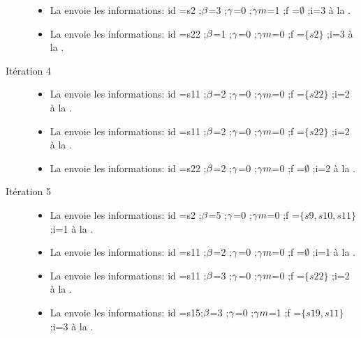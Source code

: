 \begin{Exemple}
\begin{description}
\begin{itemize}
			\item  La \mtree{} envoie les informations: id =s2 ;$\beta{}$=3 ;$\gamma{}$=0 ;$\gamma m{}$=1 ;f =$\emptyset$ ;i=3 à la \mone{}.
			\item  La \mtree{} envoie les informations: id =s22 ;$\beta{}$=1 ;$\gamma{}$=0 ;$\gamma m{}$=0 ;f =$\{s2\}$ ;i=3 à la \mtwo{}.
			\end{itemize}
		\item[Itération 4]
		\begin{itemize}
			\item  La \mtwo{} envoie les informations: id =s11 ;$\beta{}$=2 ;$\gamma{}$=0 ;$\gamma m{}$=0 ;f =$\{s22\}$ ;i=2 à la \mone{}.
			\item  La \mtwo{} envoie les informations: id =s11 ;$\beta{}$=2 ;$\gamma{}$=0 ;$\gamma m{}$=0 ;f =$\{s22\}$ ;i=2 à la \mtree{}.
			\item  La \mtwo{} envoie les informations: id =s22 ;$\beta{}$=2 ;$\gamma{}$=0 ;$\gamma m{}$=0 ;f =$\emptyset$ ;i=2 à la \mtwo{}.
			\end{itemize}
			\item[Itération 5]
		\begin{itemize}
		\item  La \mone{} envoie les informations: id =s2 ;$\beta{}$=5 ;$\gamma{}$=0 ;$\gamma m{}$=0 ;f =$\{s9,s10,s11\}$ ;i=1 à la \mtree{}.
			\item  La \mone{} envoie les informations: id =s11 ;$\beta{}$=2 ;$\gamma{}$=0 ;$\gamma m{}$=0 ;f =$\emptyset$ ;i=1 à la \mtwo{}.
			\item  La \mtree{} envoie les informations: id =s11 ;$\beta{}$=3 ;$\gamma{}$=0 ;$\gamma m{}$=0 ;f =$\{s22\}$ ;i=2 à la \mtwo{}.
			\item La \mtree{} envoie les informations: id =s15;$\beta{}$=3 ;$\gamma{}$=0 ;$\gamma m{}$=1 ;f =$\{s19,s11\}$ ;i=3	 à la \mtwo{}.
			\end{itemize}	
	\end{description}

\end{Exemple}


\begin{algorithm}
 \SetAlgoLined\DontPrintSemicolon
\end{algorithm}

